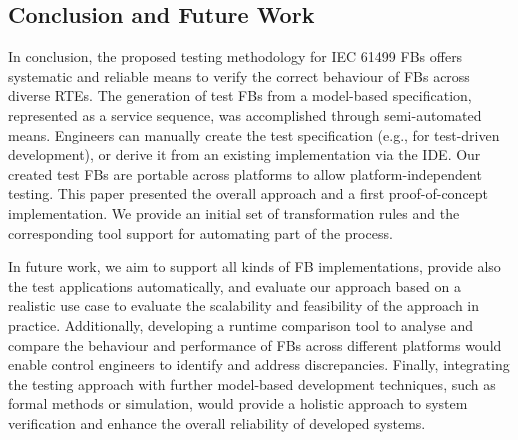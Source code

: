 \begin{bibunit}
\section{Conclusion and Future Work}
\label{sec::conclusions}
In conclusion, the proposed testing methodology for IEC 61499 FBs offers systematic and reliable means to verify the correct behaviour of FBs across diverse RTEs. The generation of test FBs from a model-based specification, represented as a service sequence, was accomplished through semi-automated means. Engineers can manually create the test specification (e.g., for test-driven development), or derive it from an existing implementation via the IDE. Our created test FBs are portable across platforms to allow platform-independent testing. This paper presented the overall approach and a first proof-of-concept implementation. We provide an initial set of transformation rules and the corresponding tool support for automating part of the process.

In future work, we aim to support all kinds of FB implementations, provide also the test applications automatically, and evaluate our approach based on a realistic use case to evaluate the scalability and feasibility of the approach in practice. Additionally, developing a runtime comparison tool to analyse and compare the behaviour and performance of FBs across different platforms would enable control engineers to identify and address discrepancies. Finally, integrating the testing approach with further model-based development techniques, such as formal methods or simulation, would provide a holistic approach to system verification and enhance the overall reliability of developed systems.

\clearpage
\putbib
\end{bibunit} 